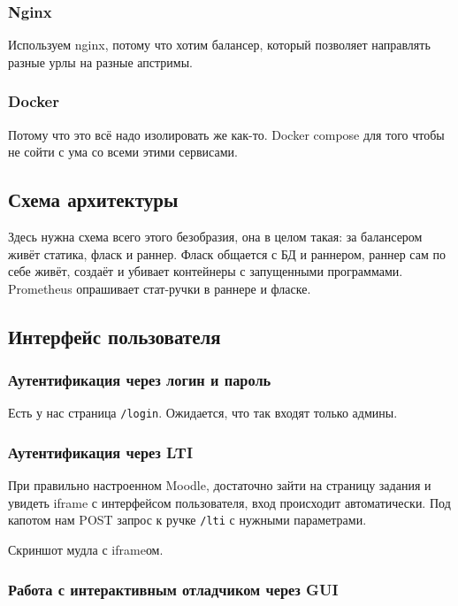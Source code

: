 \documentclass[a4paper,article,14pt]{extarticle}
\begin{document}
\subsubsection{Nginx}
Используем nginx, потому что хотим балансер, который позволяет направлять разные урлы на разные апстримы.

\subsubsection{Docker}
Потому что это всё надо изолировать же как-то. Docker compose для того чтобы не сойти с ума со всеми этими сервисами.

\subsection{Схема архитектуры}

Здесь нужна схема всего этого безобразия, она в целом такая: за балансером живёт статика, фласк и раннер. Фласк общается с БД и раннером, раннер сам по себе живёт, создаёт и убивает контейнеры с запущенными программами. Prometheus опрашивает стат-ручки в раннере и фласке.

\subsection{Интерфейс пользователя}

\subsubsection{Аутентификация через логин и пароль}

Есть у нас страница \texttt{/login}. Ожидается, что так входят только админы.

\subsubsection{Аутентификация через LTI}

При правильно настроенном Moodle, достаточно зайти на страницу задания и увидеть iframe с интерфейсом пользователя, вход происходит автоматически. Под капотом нам POST запрос к ручке \texttt{/lti} с нужными параметрами.

Скриншот мудла с iframeом.

\subsubsection{Работа с интерактивным отладчиком через GUI}
\end{document}
